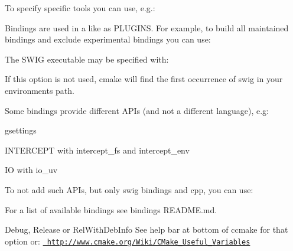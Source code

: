 \begin{DoxyCode}{0}
\end{DoxyCode}


To specify specific tools you can use, e.\+g.\+:


\begin{DoxyCode}{0}
\end{DoxyCode}


Bindings are used in a like as {\ttfamily P\+L\+U\+G\+I\+NS}. For example, to build all maintained bindings and exclude experimental bindings you can use\+:


\begin{DoxyCode}{0}
\end{DoxyCode}


The S\+W\+IG executable may be specified with\+:


\begin{DoxyCode}{0}
\end{DoxyCode}


If this option is not used, cmake will find the first occurrence of {\ttfamily swig} in your environment\textquotesingle{}s path.

Some bindings provide different A\+P\+Is (and not a different language), e.\+g\+:


\begin{DoxyItemize}
\item {\ttfamily gsettings}
\item {\ttfamily I\+N\+T\+E\+R\+C\+E\+PT} with {\ttfamily intercept\+\_\+fs} and {\ttfamily intercept\+\_\+env}
\item {\ttfamily IO} with {\ttfamily io\+\_\+uv}
\end{DoxyItemize}

To not add such A\+P\+Is, but only {\ttfamily swig} bindings and {\ttfamily cpp}, you can use\+:


\begin{DoxyCode}{0}
\end{DoxyCode}


For a list of available bindings see binding\textquotesingle{}s R\+E\+A\+D\+ME.md.

{\ttfamily Debug}, {\ttfamily Release} or {\ttfamily Rel\+With\+Deb\+Info} See help bar at bottom of {\ttfamily ccmake} for that option or\+: \href{http://www.cmake.org/Wiki/CMake_Useful_Variables}{\texttt{ http\+://www.\+cmake.\+org/\+Wiki/\+C\+Make\+\_\+\+Useful\+\_\+\+Variables}}

